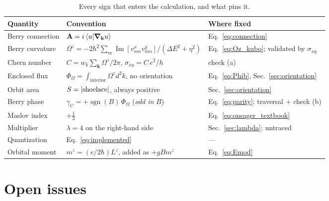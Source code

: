 \documentclass[11pt]{article}
\newcommand{\Imag}{\operatorname{Im}}
\newcommand{\kb}{\mathbf{k}}
\newcommand{\Om}{\Omega}
\newcommand{\Bfield}{B}
\newcommand{\sgn}{\operatorname{sgn}}
\newcommand{\Phib}{\Phi_{\!\Om}}
\begin{document}
\begin{table}[h]
\centering
\begin{tabular}{@{}lll@{}}
\toprule
Quantity & Convention & Where fixed \\
\midrule
Berry connection & $\mathbf{A} = i\braket{u}{\grad_\kb u}$
  & Eq.~\eqref{eq:connection} \\
Berry curvature & $\Om^z = -2\hbar^2\sum_m
  \Imag[v^x_{nm}v^y_{mn}]/(\Delta E^2+\eta^2)$
  & Eq.~\eqref{eq:Oz_kubo}; validated by $\sigma_{xy}$ \\
Chern number & $C = w_k\sum_\kb \Om^z/2\pi$, $\sigma_{xy}=C\,e^2/h$
  & check (a) \\
Enclosed flux & $\Phib = \int_{\text{interior}}\Om^z d^2k$, no orientation
  & Eq.~\eqref{eq:Phib}, Sec.~\ref{sec:orientation} \\
Orbit area & $S = \abs{\text{shoelace}}$, always positive
  & Sec.~\ref{sec:orientation} \\
Berry phase & $\gamma_C = +\sgn(\Bfield)\,\Phib$ \quad(\emph{odd in} $\Bfield$)
  & Eq.~\eqref{eq:parity}; traversal $+$ check (b) \\
Maslov index & $+\tfrac12$ & Eq.~\eqref{eq:onsager_textbook} \\
Multiplier & $\lambda = 4$ on the right-hand side
  & Sec.~\ref{sec:lambda}; untraced \\
Quantization & Eq.~\eqref{eq:implemented} & --- \\
Orbital moment & $m^z = (e/2\hbar)L^z$, added as $+g\Bfield m^z$
  & Eq.~\eqref{eq:Emod} \\
\bottomrule
\end{tabular}
\caption{Every sign that enters the calculation, and what pins it.}
\end{table}

\section{Open issues}\label{sec:open}
\end{document}
